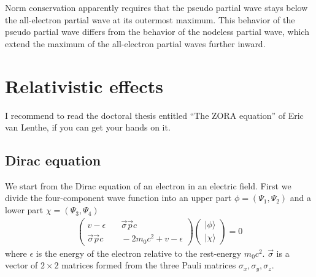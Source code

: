 \documentclass[11pt,a4paper]{report}
\begin{document}
Norm conservation apparently requires that the pseudo partial wave
stays below the all-electron partial wave at its outermost
maximum. This behavior of the pseudo partial wave differs from the
behavior of the nodeless partial wave, which extend the maximum of the
all-electron partial waves further inward.


\section{Relativistic effects}
I recommend to read the doctoral thesis entitled ``The ZORA equation''
of Eric van Lenthe\cite{lenthe96_thesis}, if you can get your hands on
it.


\subsection{Dirac equation}
We start from the Dirac equation of an electron in an electric field.
First we divide the four-component wave function into an upper part
$\phi=(\Psi_1,\Psi_2)$ and a lower part $\chi=(\Psi_3,\Psi_4)$
\begin{eqnarray}
\left(\begin{array}{cc}
v-\epsilon &\quad \vec{\sigma}\vec{p}c\\
\vec{\sigma}\vec{p}c &\quad -2m_0c^2+v-\epsilon\end{array}\right)
\left(\begin{array}{c}|\phi\rangle\\|\chi\rangle\end{array}\right)=0
\label{eq:dirac2by2withepsilon}
\end{eqnarray}
where $\epsilon$ is the energy of the electron relative to the
rest-energy $m_0c^2$. $\vec{\sigma}$ is a vector of $2\times2$
matrices formed from the three Pauli matrices
$\sigma_x,\sigma_y,\sigma_z$.
\end{document}
